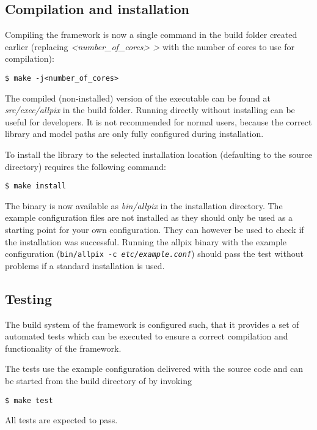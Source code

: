 \subsection{Compilation and installation}
Compiling the framework is now a single command in the build folder created earlier (replacing \textit{\textless number\_of\_cores> \textgreater} with the number of cores to use for compilation):
\begin{verbatim}
$ make -j<number_of_cores>
\end{verbatim}
The compiled (non-installed) version of the executable can be found at \textit{src/exec/allpix} in the build folder.
Running \apsq directly without installing can be useful for developers.
It is not recommended for normal users, because the correct library and model paths are only fully configured during installation.

To install the library to the selected installation location (defaulting to the source directory) requires the following command:
\begin{verbatim}
$ make install
\end{verbatim}

The binary is now available as \textit{bin/allpix} in the installation directory.
The example configuration files are not installed as they should only be used as a starting point for your own configuration.
They can however be used to check if the installation was successful.
Running the allpix binary with the example configuration (\texttt{bin/allpix -c \textit{etc/example.conf}}) should pass the test without problems if a standard installation is used.

\subsection{Testing}
The build system of the framework is configured such, that it provides a set of automated tests which can be executed to ensure a correct compilation and functionality of the framework.

The tests use the example configuration delivered with the source code and can be started from the build directory of \apsq by invoking
\begin{verbatim}
$ make test
\end{verbatim}

All tests are expected to pass.

